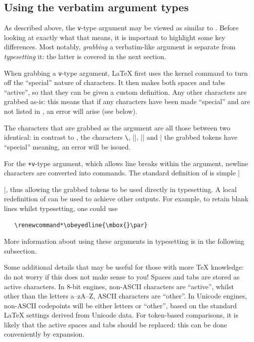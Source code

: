 \documentclass{ltxguide}
\begin{document}
\subsection{Using the verbatim argument types}

As described above, the \texttt{v}-type argument may be viewed as similar to
. Before looking at exactly what that means, it is important to
highlight some key differences. Most notably, \emph{grabbing} a verbatim-like
argument is separate from \emph{typesetting} it: the latter is covered in the
next section.

When grabbing a \texttt{v}-type argument, \LaTeX{} first uses the kernel
command  to turn off the \enquote{special} nature of characters.
It then makes both spaces and tabs \enquote{active}, so that they can be given
a custom definition. Any other characters are grabbed as-is: this means that if
any characters have been made \enquote{special} and are not listed in
, an error will arise (see below).

The characters that are grabbed as the argument are all those between two
identical: in contrast to , the characters \texttt{\textbackslash},
|{|, |}| and |%
the grabbed tokens have \enquote{special} meaning, an error will be issued.

For the \texttt{+v}-type argument, which allows line breaks within the
argument, newline characters are converted into  commands. The
standard definition of  is simple |\par|, thus allowing the
grabbed tokens to be used directly in typesetting. A local redefinition of
 can be used to achieve other outputs. For example, to retain
blank lines whilst typesetting, one could use
\begin{verbatim}
   \renewcommand*\obeyedline{\mbox{}\par}
\end{verbatim}
More information about using these arguments in typesetting is in the following
subsection.

Some additional details that may be useful for those with more \TeX{}
knowledge: do not worry if this does not make sense to you! Spaces and tabs are
stored as active characters. In $8$-bit engines, non-ASCII characters are
\enquote{active}, whilst other than the letters a--zA--Z, ASCII characters are
\enquote{other}. In Unicode engines, non-ASCII codepoints will be either
letters or \enquote{other}, based on the standard \LaTeX{} settings derived
from Unicode data. For token-based comparisons, it is likely that the active
spaces and tabs should be replaced: this can be done conveniently by expansion.
\end{document}
